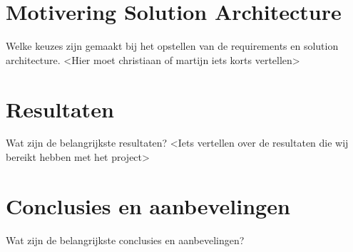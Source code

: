 \section{Motivering Solution Architecture}
Welke keuzes zijn gemaakt bij het opstellen van de requirements en solution architecture.
<Hier moet christiaan of martijn iets korts vertellen>

\section{Resultaten}
Wat zijn de belangrijkste resultaten?
<Iets vertellen over de resultaten die wij bereikt hebben met het project>

\section{Conclusies en aanbevelingen}
Wat zijn de belangrijkste conclusies en aanbevelingen?